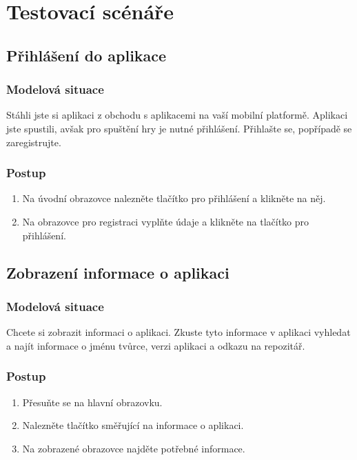 \chapter{Testovací scénáře}
\label{chap:test-scenarios}

\section{Přihlášení do aplikace}
\label{scen:login}

\subsection*{Modelová situace}

Stáhli jste si aplikaci z obchodu s aplikacemi na vaší mobilní platformě.
Aplikaci jste spustili,
avšak pro spuštění hry je nutné přihlášení.
Přihlašte se, popřípadě se zaregistrujte.

\subsection*{Postup}

\begin{enumerate}
    \item Na úvodní obrazovce nalezněte tlačítko pro přihlášení
    a klikněte na něj.
    \item Na obrazovce pro registraci vyplňte údaje
    a klikněte na tlačítko pro přihlášení.
\end{enumerate}

\section{Zobrazení informace o aplikaci}
\label{scen:about}

\subsection*{Modelová situace}

Chcete si zobrazit informaci o aplikaci.
Zkuste tyto informace v aplikaci vyhledat a najít informace o
jménu tvůrce, verzi aplikaci a odkazu na repozitář.

\subsection*{Postup}

\begin{enumerate}
    \item Přesuňte se na hlavní obrazovku.
    \item Nalezněte tlačítko směřující na informace o aplikaci.
    \item Na zobrazené obrazovce najděte potřebné informace.
\end{enumerate}

